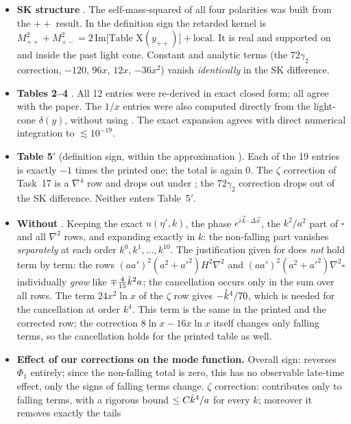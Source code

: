 \begin{resultbox}
\begin{itemize}[leftmargin=12pt,itemsep=2pt]
\item \textbf{SK structure} \tD. The self-mass-squared of all four polarities was built from the $++$ result.
In the definition sign the retarded kernel is
$M^2_{++}+M^2_{+-}=2\,\mathrm{Im}\big[\text{Table X}(y_{++})\big]+\text{local}$.
It is real and supported on and inside the past light cone. Constant and analytic terms
(the $72\gamma_2$ correction, $-120$, $96x$, $12x$, $-36x^2$) vanish \emph{identically} in the SK difference.
\item \textbf{Tables 2--4} \tC. All 12 entries were re-derived in exact closed form; all agree with the paper.
The $1/x$ entries were also computed directly from the light-cone $\delta(y)$, without using .
The exact expansion agrees with direct numerical integration to $\lesssim10^{-19}$.
\item \textbf{Table 5$'$} (definition sign, within the approximation ). Each of the 19 entries is exactly $-1$
times the printed one; the total is again $0$. The $\zeta$ correction of Task~17 is a $\nabla^4$ row and drops out under ;
the $72\gamma_2$ correction drops out of the SK difference. Neither enters Table~5$'$.
\item \textbf{Without } \tD\tC. Keeping the exact $u(\eta',k)$, the phase $e^{i\vec k\cdot\Delta\vec x}$, the $k^2/a^2$ part of $\square$
and all $\nabla^2$ rows, and expanding exactly in $k$: the non-falling part vanishes \emph{separately} at each order
$k^0,k^1,\dots,k^{10}$. The justification given for  does \emph{not} hold term by term: the rows
$(aa')^2(a^2+a'^2)H^2\nabla^2$ and $(aa')^2(a^2+a'^2)\nabla^2\square$ individually \emph{grow} like $\mp\tfrac4{15}\hat k^2a$;
the cancellation occurs only in the sum over all rows. The term $24x^2\ln x$ of the $\zeta$ row gives $-\hat k^4/70$,
which is needed for the cancellation at order $k^4$. This term is the same in the printed and the corrected row; the correction
$8\ln x-16x\ln x$ itself changes only falling terms, so the cancellation holds for the printed table as well.
\item \textbf{Effect of our corrections on the mode function.}
Overall sign: reverses $\Phi_1$ entirely; since the non-falling total is zero, this has no observable late-time effect, only the signs of falling terms change.
$\zeta$ correction: contributes only to falling terms, with a rigorous bound $\le C\hat k^4/a$ for every $k$; moreover it removes exactly the tails

\end{itemize}
\end{resultbox}
